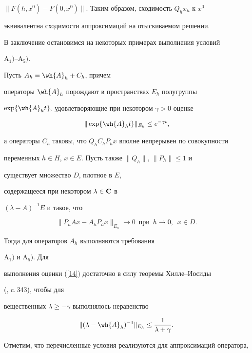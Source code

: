 $\|F(h, x^0)-F(0, x^0)\|$. Таким образом, сходимость $Q_hx_h$ к $x^0$ 


эквивалентна сходимости аппроксимаций на отыскиваемом решении.





В заключение остановимся на некоторых примерах выполнения условий 


$\mathrm A_1)$--$\mathrm A_5)$.





Пусть $A_h=\wh{A}_h+C_h$, причем 


операторы $\wh{A}_h$ порождают в пространствах $E_h$ полугруппы


$\exp\{\wh{A}_ht\},$ удовлетворяющие при некотором $\gamma>0$ оценке 


\begin{equation}\label{14}


\|\exp\{\wh{A}_ht\}\|_{E_h}\leq e^{-\gamma t},


\end{equation} 


а операторы $C_h$ таковы, что $Q_hC_hP_hx$ вполне непрерывен по совокупности


переменных $h\in H$, $x\in E$. Пусть также $\|Q_h\|,\, \|P_h\|\leq 1$ и


существует множество $D$, плотное в $E$,


содержащееся при некотором $\lambda\in \bold C$ в


$(\lambda-A)^{-1}E$ и такое, что 


$$


\|P_hAx-A_hP_hx\|_{E_h}\to 0\ \; \text{при}\ \; h\to 0, \ \; x\in D.


$$ 


Тогда для операторов $A_h$ выполняются требования


$\mathrm A_1)$ и $\mathrm A_5)$. Для 


выполнения оценки (\ref{14}) достаточно в силу теоремы Хилле--Иосиды


(\cite{8}, c.\,343), чтобы для 


вещественных $\lambda \geq -\gamma$ выполнялось неравенство


$$


\|(\lambda-\wh{A}_h)^{-1}\|_{E_h}\leq \frac {1}{\lambda+\gamma}.


$$


 


Отметим, что перечисленные условия реализуются для аппроксимаций оператора, 


